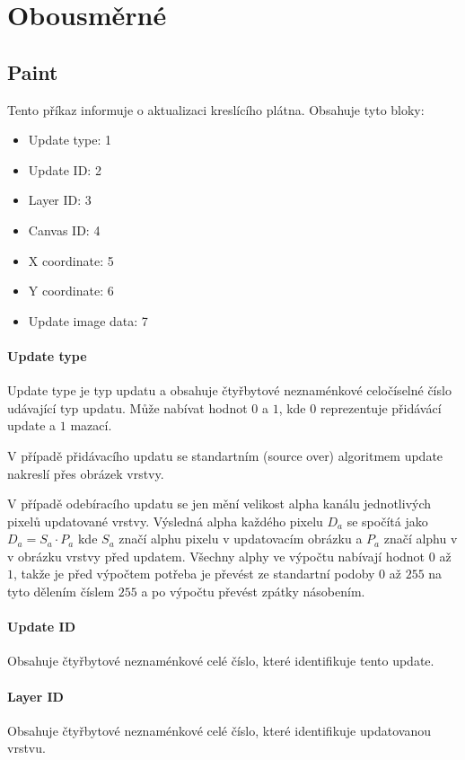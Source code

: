 \documentclass[12pt,oneside,a4paper]{report}
\begin{document}
\section{Obousměrné}

\subsection{Paint}

Tento příkaz informuje o aktualizaci kreslícího plátna. Obsahuje tyto bloky:

\begin{itemize}
	\item Update type: 1
	\item Update ID: 2
	\item Layer ID: 3
	\item Canvas ID: 4
	\item X coordinate: 5
	\item Y coordinate: 6
	\item Update image data: 7						
\end{itemize}

\paragraph{Update type}
Update type je typ updatu a obsahuje čtyřbytové neznaménkové celočíselné číslo udávající typ updatu. Může nabívat hodnot $0$ a $1$, kde $0$ reprezentuje přidávácí update a $1$ mazací.

V případě přidávacího updatu se standartním (source over) algoritmem update nakreslí přes obrázek vrstvy. 

V případě odebíracího updatu se jen mění velikost alpha kanálu jednotlivých pixelů updatované vrstvy. Výsledná alpha každého pixelu $D_{a}$ se spočítá jako $D_{a} = S_{a} \cdot P_{a}$ kde $S_{a}$ značí alphu pixelu v updatovacím obrázku a $P_{a}$ značí alphu v v obrázku vrstvy před updatem. Všechny alphy ve výpočtu nabívají hodnot $0$ až $1$, takže je před výpočtem potřeba je převést ze standartní podoby $0$ až $255$ na tyto dělením číslem $255$ a po výpočtu převést zpátky násobením.

\paragraph{Update ID}
Obsahuje čtyřbytové neznaménkové celé číslo, které identifikuje tento update.

\paragraph{Layer ID}
Obsahuje čtyřbytové neznaménkové celé číslo, které identifikuje updatovanou vrstvu.
\end{document}
